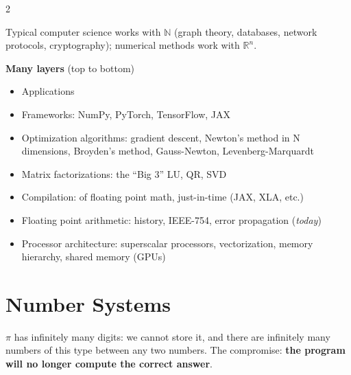 \documentclass[a4paper,9pt]{extarticle}
\begin{document}
\begin{multicols}{2}
\begin{definition}
Typical computer science works with $\mathbb{N}$ (graph theory, databases, network protocols,
cryptography); numerical methods work with $\mathbb{R}^n$.

\end{definition}


\begin{summary}

\textbf{Many layers} (top to bottom)

\begin{itemize}

\item Applications

\item Frameworks: NumPy, PyTorch, TensorFlow, JAX

\item Optimization algorithms: gradient descent, Newton's method in N dimensions, Broyden's
method, Gauss-Newton, Levenberg-Marquardt

\item Matrix factorizations: the ``Big 3'' LU, QR, SVD

\item Compilation: of floating point math, just-in-time (JAX, XLA, etc.)

\item Floating point arithmetic: history, IEEE-754, error propagation (\emph{today})

\item Processor architecture: superscalar processors, vectorization, memory hierarchy, shared
memory (GPUs)

\end{itemize}

\end{summary}



\section{Number Systems}


\begin{important}

$\pi$ has infinitely many digits: we cannot store it, and there are infinitely many numbers of
this type between any two numbers. The compromise: \textbf{the program will no longer compute
the correct answer}.

\end{important}



\end{multicols}
\end{document}
